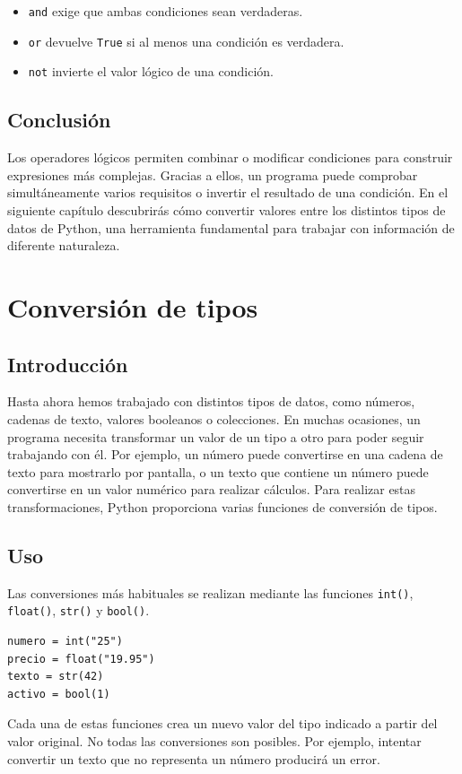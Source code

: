 \documentclass[11pt,a5paper,twoside]{book}
\begin{document}
\begin{itemize}
\item  {\scriptsize \texttt{and}} exige que ambas condiciones sean verdaderas.
\item  {\scriptsize \texttt{or}} devuelve {\scriptsize \texttt{True}} si al menos una condición es verdadera.
\item  {\scriptsize \texttt{not}} invierte el valor lógico de una condición.
\end{itemize}
\subsection{Conclusión}
Los operadores lógicos permiten combinar o modificar condiciones para construir expresiones más complejas. Gracias a ellos, un programa puede comprobar simultáneamente varios requisitos o invertir el resultado de una condición.
En el siguiente capítulo descubrirás cómo convertir valores entre los distintos tipos de datos de Python, una herramienta fundamental para trabajar con información de diferente naturaleza.

\newpage

\section{Conversión de tipos}
\subsection{Introducción}
Hasta ahora hemos trabajado con distintos tipos de datos, como números, cadenas de texto, valores booleanos o colecciones. En muchas ocasiones, un programa necesita transformar un valor de un tipo a otro para poder seguir trabajando con él.
Por ejemplo, un número puede convertirse en una cadena de texto para mostrarlo por pantalla, o un texto que contiene un número puede convertirse en un valor numérico para realizar cálculos.
Para realizar estas transformaciones, Python proporciona varias funciones de conversión de tipos.
\subsection{Uso}
Las conversiones más habituales se realizan mediante las funciones {\scriptsize \texttt{int()}}, {\scriptsize \texttt{float()}}, {\scriptsize \texttt{str()}} y {\scriptsize \texttt{bool()}}.


\begin{tcolorbox}
\scriptsize
 \begin{verbatim}
numero = int("25")
precio = float("19.95")
texto = str(42)
activo = bool(1)
\end{verbatim}
\end{tcolorbox}
Cada una de estas funciones crea un nuevo valor del tipo indicado a partir del valor original.
No todas las conversiones son posibles. Por ejemplo, intentar convertir un texto que no representa un número producirá un error.
\end{document}
